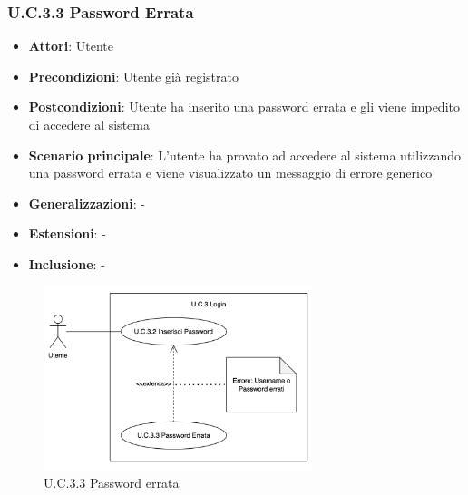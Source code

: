 \subsubsection{U.C.3.3 Password Errata}
\begin{itemize}
    \item \textbf{Attori}: Utente
    \item \textbf{Precondizioni}: Utente già registrato
    \item \textbf{Postcondizioni}: Utente ha inserito una password errata e gli viene impedito di accedere al sistema
    \item \textbf{Scenario principale}: L'utente ha provato ad accedere al sistema utilizzando una password errata e viene visualizzato un messaggio di errore generico
    \item \textbf{Generalizzazioni}: -
    \item \textbf{Estensioni}: -
    \item \textbf{Inclusione}: -
\end{itemize}
\begin{figure}[H]
    \centering
    \includegraphics[width=0.7\textwidth]{img/UC3-3.png}
    \caption{U.C.3.3 Password errata}
\end{figure}
